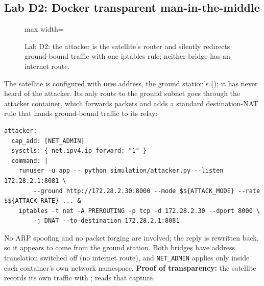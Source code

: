 \subsection{Lab D2: Docker transparent man-in-the-middle}
\begin{figure}[!htbp]
\centering
\begin{adjustbox}{max width=\textwidth}
\end{adjustbox}
\caption{Lab D2: the attacker is the satellite's router and silently redirects ground-bound traffic with one iptables rule; neither bridge has an internet route.}
\end{figure}
The satellite is configured with \textbf{one} address, the ground station's (); it has never heard of the attacker. Its only route to the ground subnet goes through the attacker container, which forwards packets and adds a standard destination-NAT rule that hands ground-bound traffic to its relay:
\begin{lstlisting}[style=sh]
attacker:
  cap_add: [NET_ADMIN]
  sysctls: { net.ipv4.ip_forward: "1" }
  command: |
    runuser -u app -- python simulation/attacker.py --listen 172.28.2.1:8081 \
        --ground http://172.28.2.30:8000 --mode $${ATTACK_MODE} --rate $${ATTACK_RATE} ... &
    iptables -t nat -A PREROUTING -p tcp -d 172.28.2.30 --dport 8000 \
        -j DNAT --to-destination 172.28.2.1:8081
\end{lstlisting}
No ARP spoofing and no packet forging are involved; the reply is rewritten back, so it appears to come from the ground station. Both bridges have address translation switched off (no internet route), and \texttt{NET\_ADMIN} applies only inside each container's own network namespace. \textbf{Proof of transparency:} the satellite records its own traffic with ;  reads that capture.

